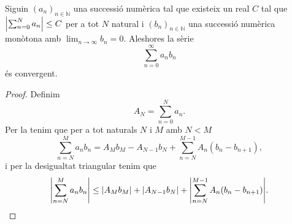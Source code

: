 \documentclass[../../Main.tex]{subfiles}
\begin{document}
	\begin{theorem}
		\label{thm:Teorema de Dirichlet per sèries numèriques}
		Siguin \((a_{n})_{n\in\mathbb{N}}\) una successió numèrica tal que existeix un real \(C\) tal que \(\abs{\sum_{n=0}^{N}a_{n}}\leq C\) per a tot \(N\) natural i \((b_{n})_{n\in\mathbb{N}}\) una successió numèrica monòtona amb \(\lim_{n\to\infty}b_{n}=0\). Aleshores la sèrie
		\[\sum_{n=0}^{\infty}a_{n}b_{n}\]
		és convergent.
		\begin{proof}
			Definim
			\[A_{N}=\sum_{n=0}^{N}a_{n}.\]
			Per la  tenim que per a tot naturals \(N\) i \(M\) amb \(N<M\)
			\[\sum_{n=N}^{M}a_{n}b_{n}=A_{M}b_{M}-A_{N-1}b_{N}+\sum_{n=N}^{M-1}A_{n}(b_{n}-b_{n+1}),\]
			i per la desigualtat triangular %
			tenim que
			\begin{equation}
				\label{thm:Teorema de Dirichlet per sèries numèriques:eq1}
				\abs{\sum_{n=N}^{M}a_{n}b_{n}}\leq\abs{A_{M}b_{M}}+\abs{A_{N-1}b_{N}}+\abs{\sum_{n=N}^{M-1}A_{n}(b_{n}-b_{n+1})}.
			\end{equation}
			

\end{proof}
\end{theorem}
\end{document}
